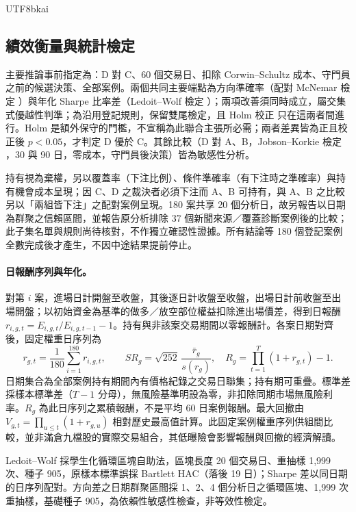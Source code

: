 \documentclass[12pt,a4paper]{article}
\newcommand{\grp}[1]{\textsf{#1}}
\begin{document}
\begin{CJK}{UTF8}{bkai}
\subsection{績效衡量與統計檢定}

主要推論事前指定為：\grp{D} 對 \grp{C}、60 個交易日、扣除 Corwin--Schultz 成本、守門員之前的候選決策、全部案例。兩個共同主要端點為方向準確率（配對 McNemar 檢定 \citep{mcnemar1947}）與年化 Sharpe 比率差（Ledoit--Wolf 檢定 \citep{ledoit2008sharpe}）；兩項改善須同時成立，屬交集式優越性判準；為沿用登記規則，保留雙尾檢定，且 Holm 校正 \citep{holm1979} 只在這兩者間進行。Holm 是額外保守的門檻，不宣稱為此聯合主張所必需；兩者差異皆為正且校正後 $p<0.05$，才判定 \grp{D} 優於 \grp{C}。其餘比較（\grp{D} 對 \grp{A}、\grp{B}，Jobson--Korkie 檢定 \citep{jobson1981sharpe}，30 與 90 日，零成本，守門員後決策）皆為敏感性分析。

持有視為棄權，另以覆蓋率（下注比例）、條件準確率（有下注時之準確率）與持有機會成本呈現；因 \grp{C}、\grp{D} 之裁決者必須下注而 \grp{A}、\grp{B} 可持有，與 \grp{A}、\grp{B} 之比較另以「兩組皆下注」之配對案例呈現。180 案共享 20 個分析日，故另報告以日期為群聚之信賴區間，並報告原分析排除 37 個新聞來源／覆蓋診斷案例後的比較；此子集名單與規則尚待核對，不作獨立確認性證據。所有結論等 180 個登記案例全數完成後才產生，不因中途結果提前停止。

\paragraph{日報酬序列與年化。} 對第 $i$ 案，進場日計開盤至收盤，其後逐日計收盤至收盤，出場日計前收盤至出場開盤；以初始資金為基準的做多／放空部位權益扣除進出場價差，得到日報酬 $r_{i,g,t}=E_{i,g,t}/E_{i,g,t-1}-1$。持有與非該案交易期間以零報酬計。各案日期對齊後，固定權重日序列為
\[
 r_{g,t}=\frac{1}{180}\sum_{i=1}^{180}r_{i,g,t},\qquad
 SR_g=\sqrt{252}\,\frac{\bar r_g}{s(r_g)},\quad
 R_g=\prod_{t=1}^{T}(1+r_{g,t})-1.
\]
日期集合為全部案例持有期間內有價格紀錄之交易日聯集；持有期可重疊。標準差採樣本標準差（$T-1$ 分母），無風險基準明設為零，非扣除同期市場無風險利率。$R_g$ 為此日序列之累積報酬，不是平均 60 日案例報酬。最大回撤由 $V_{g,t}=\prod_{u\leq t}(1+r_{g,u})$ 相對歷史最高值計算。此固定案例權重序列供組間比較，並非滿倉九檔股的實際交易組合，其低曝險會影響報酬與回撤的經濟解讀。

Ledoit--Wolf 採學生化循環區塊自助法，區塊長度 20 個交易日、重抽樣 1,999 次、種子 905，原樣本標準誤採 Bartlett HAC（落後 19 日）；Sharpe 差以同日期的日序列配對。方向差之日期群聚區間採 1、2、4 個分析日之循環區塊、1,999 次重抽樣，基礎種子 905，為依賴性敏感性檢查，非等效性檢定。


\end{CJK}
\end{document}
